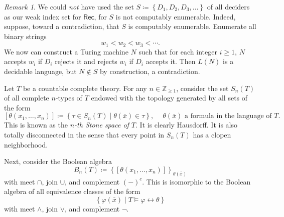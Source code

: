 \documentclass[10pt,letterpaper,cm]{nupset}
\theoremstyle{definition}
\theoremstyle{theorem}
\theoremstyle{remark}
\newtheorem*{remark}{Remark}
\newcommand{\Z}{\mathbb Z}
\newcommand{\1}{\mathbb{1}}
\newcommand{\0}{\vec 0}
\begin{document}
\begin{solution}
\begin{remark}
We could \emph{not} have used the set $S\coloneqq \left\{D_1, D_2, D_3, \ldots \right\}$ of all  deciders as our weak index set for $\mathsf{Rec}$, for $S$ is not computably enumerable. Indeed, suppose, toward a contradiction, that $S$ is computably enumerable. Enumerate all binary strings $$w_1 < w_2 < w_3 < \cdots.$$ We now can construct a Turing machine $N$ such that for each integer $i\geq 1$,  $N$ accepts $w_i$ if $D_i$ rejects  it and rejects $w_i$ if $D_i$ accepts it. Then $L(N)$ is a decidable language, but $N\notin S$ by construction, a contradiction.
\end{remark}
\end{solution}

\bigskip

Let $T$ be a countable complete theory. For any $n\in \Z_{\geq 1}$, consider the set $S_n(T)$ of all complete $n$-types of $T$ endowed with the topology generated by all sets of the form
\[
\left[\theta(x_1, \ldots, x_n)\right] \coloneqq \left\{\tau \in S_n(T)\mid  \theta(\bar{x}) \in \tau   \right\}, \ \text{$\quad \theta(\bar{x})$ a formula in the language of $T$}.
\] This is known as the \textit{$n$-th Stone space of $T$}. It is clearly Hausdorff. It is also totally disconnected in the sense that every point in $S_n(T)$ has a clopen neighborhood.

\smallskip

Next, consider the Boolean algebra $$B_n(T)\coloneqq \left\{\left[\theta(x_1, \ldots, x_n)\right]\right\}_{\theta(\bar{x})}$$
with meet $\cap$, join $\cup$, and complement $\left({-}\right)^c$. This is isomorphic to the Boolean algebra of all equivalence classes of the form
$$\left\{\varphi(\bar{x}) \mid T \models \varphi \leftrightarrow \theta\right\}$$ with meet $\land$, join $\vee$, and complement $\neg{}$. 
\end{document}
